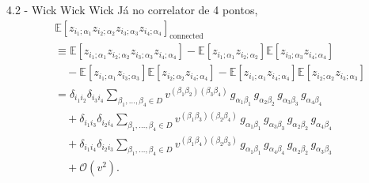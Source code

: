 \documentclass{beamer}
\begin{document}
\begin{frame}{4.2 - Wick Wick Wick}
    Já no correlator de 4 pontos, 
    \tiny
    \begin{align*}
        &\mathbb{E} \left[ z_{i_1;\alpha_1} z_{i_2;\alpha_2} z_{i_3;\alpha_3} z_{i_4;\alpha_4} \right]_{\text{connected}}  \\
        &\equiv 
        \mathbb{E} \left[ z_{i_1;\alpha_1} z_{i_2;\alpha_2} z_{i_3;\alpha_3} z_{i_4;\alpha_4} \right] 
        - \mathbb{E} \left[ z_{i_1;\alpha_1} z_{i_2;\alpha_2} \right] \mathbb{E} \left[ z_{i_3;\alpha_3} z_{i_4;\alpha_4} \right] \\
        &\quad 
        - \mathbb{E} \left[ z_{i_1;\alpha_1} z_{i_3;\alpha_3} \right] \mathbb{E} \left[ z_{i_2;\alpha_2} z_{i_4;\alpha_4} \right] 
        - \mathbb{E} \left[ z_{i_1;\alpha_1} z_{i_4;\alpha_4} \right] \mathbb{E} \left[ z_{i_2;\alpha_2} z_{i_3;\alpha_3} \right] \\
        &= 
        \delta_{i_1 i_2} \delta_{i_3 i_4} \sum_{\beta_1, \dots, \beta_4 \in D} 
        v^{(\beta_1 \beta_2)(\beta_3 \beta_4)} \,
        g_{\alpha_1 \beta_1} \, g_{\alpha_2 \beta_2} \, g_{\alpha_3 \beta_3} \, g_{\alpha_4 \beta_4} \\
        &\quad 
        + \delta_{i_1 i_3} \delta_{i_2 i_4} \sum_{\beta_1, \dots, \beta_4 \in D} 
        v^{(\beta_1 \beta_3)(\beta_2 \beta_4)} \,
        g_{\alpha_1 \beta_1} \, g_{\alpha_3 \beta_3} \, g_{\alpha_2 \beta_2} \, g_{\alpha_4 \beta_4} \\
        &\quad 
        + \delta_{i_1 i_4} \delta_{i_2 i_3} \sum_{\beta_1, \dots, \beta_4 \in D} 
        v^{(\beta_1 \beta_4)(\beta_2 \beta_3)} \,
        g_{\alpha_1 \beta_1} \, g_{\alpha_4 \beta_4} \, g_{\alpha_2 \beta_2} \, g_{\alpha_3 \beta_3} \\
        &\quad + \mathcal{O}(v^2).
    \end{align*}
\end{frame}
\end{document}
